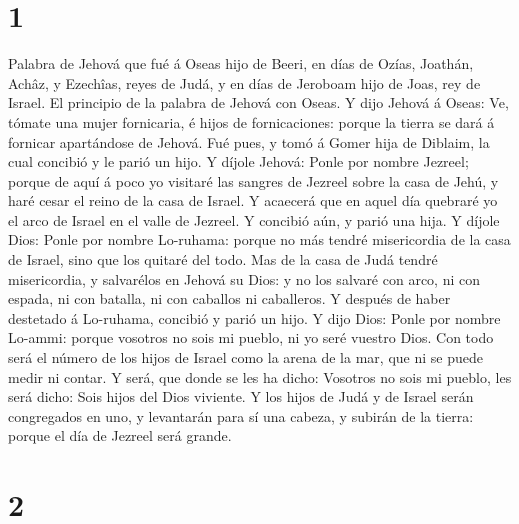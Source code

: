 \hypertarget{section}{%
\section{1}\label{section}}

 Palabra de Jehová que fué á Oseas hijo de Beeri, en días
de Ozías, Joathán, Achâz, y Ezechîas, reyes de Judá, y en días de
Jeroboam hijo de Joas, rey de Israel.  El principio de la
palabra de Jehová con Oseas. Y dijo Jehová á Oseas: Ve, tómate una mujer
fornicaria, é hijos de fornicaciones: porque la tierra se dará á
fornicar apartándose de Jehová.  Fué pues, y tomó á Gomer
hija de Diblaim, la cual concibió y le parió un hijo.  Y
díjole Jehová: Ponle por nombre Jezreel; porque de aquí á poco yo
visitaré las sangres de Jezreel sobre la casa de Jehú, y haré cesar el
reino de la casa de Israel.  Y acaecerá que en aquel día
quebraré yo el arco de Israel en el valle de Jezreel.  Y
concibió aún, y parió una hija. Y díjole Dios: Ponle por nombre
Lo-ruhama: porque no más tendré misericordia de la casa de Israel, sino
que los quitaré del todo.  Mas de la casa de Judá tendré
misericordia, y salvarélos en Jehová su Dios: y no los salvaré con arco,
ni con espada, ni con batalla, ni con caballos ni caballeros.
 Y después de haber destetado á Lo-ruhama, concibió y
parió un hijo.  Y dijo Dios: Ponle por nombre Lo-ammi:
porque vosotros no sois mi pueblo, ni yo seré vuestro Dios.
 Con todo será el número de los hijos de Israel como la
arena de la mar, que ni se puede medir ni contar. Y será, que donde se
les ha dicho: Vosotros no sois mi pueblo, les será dicho: Sois hijos del
Dios viviente.  Y los hijos de Judá y de Israel serán
congregados en uno, y levantarán para sí una cabeza, y subirán de la
tierra: porque el día de Jezreel será grande.

\hypertarget{section-1}{%
\section{2}\label{section-1}}

